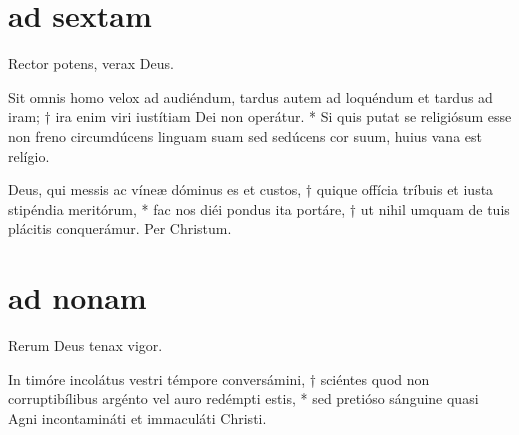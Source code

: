 \section[horae minores]{ad sextam}

 Rector potens, verax Deus.

\def\greinitialformat#1{{\fontsize{40}{40}\selectfont #1}}
\gresetfirstlineaboveinitial{\small \textcolor{red}{ xiv - xvi }}{}
\setaboveinitialseparation{0.72mm}

\vspace{0.3cm}

Sit omnis homo velox ad audiéndum, tardus autem ad loquéndum et tardus ad iram; † ira enim viri iustítiam Dei non operátur. * 
Si quis putat se religiósum esse non freno circumdúcens linguam suam sed sedúcens cor suum, huius vana est relígio.\\


Deus, qui messis ac víneæ dóminus es et custos, † quique offícia tríbuis et iusta stipéndia meritórum, * 
fac nos diéi pondus ita portáre, † ut nihil umquam de tuis plácitis conquerámur. Per Christum. 


\section[horae minores]{ad nonam}

 Rerum Deus tenax vigor.

\def\greinitialformat#1{{\fontsize{40}{40}\selectfont #1}}
\gresetfirstlineaboveinitial{\small \textcolor{red}{ xvii - ixx }}{}
\setaboveinitialseparation{0.72mm}

\vspace{0.3cm}
In timóre incolátus vestri témpore conversámini, † sciéntes quod non corruptibílibus argénto vel auro redémpti estis, * 
sed pretióso sánguine quasi Agni incontamináti et immaculáti Christi.\\


